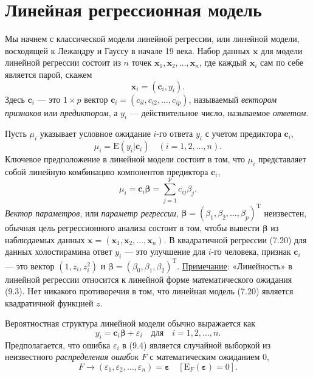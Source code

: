 \section{Линейная регрессионная модель}

Мы начнем с классической модели линейной регрессии, или линейной модели, восходящей к Лежандру и Гауссу в начале 19 века. Набор данных $\textbf{x}$ для модели линейной регрессии состоит из $n$ точек $\textbf{x}_1, \textbf{x}_2, \ldots, \textbf{x}_n$, где каждый $\textbf{x}_i$ сам по себе является парой, скажем
\begin{equation}
	\textbf{x}_i = (\textbf{c}_i, y_i).
\end{equation}
Здесь $\textbf{c}_i$ --- это $1 \times p$ вектор $\textbf{c}_i = (c_{il}, c_{i2}, \ldots, c_{ip})$, называемый \textit{вектором признаков} или \textit{предиктором}, а $y_i$ --- действительное число, называемое \textit{ответом}.

Пусть $\mu_i$ указывает условное ожидание $i$-го ответа $y_i$ с учетом предиктора $\textbf{c}_i$,
\begin{equation}
	\mu_i = \text{E}(y_i|\textbf{c}_i) \quad (i = 1,2, \ldots, n).
\end{equation}
Ключевое предположение в линейной модели состоит в том, что $\mu_i$ представляет собой линейную комбинацию компонентов предиктора $\textbf{c}_i$,
\begin{equation}
	\mu_i = \textbf{c}_i \bm{\beta} = \sum\limits_{j=1}^{p} c_{ij} \beta_j.
\end{equation}
\textit{Вектор параметров}, или \textit{параметр регрессии}, $\bm{\beta} = (\beta_1, \beta_2, \ldots, \beta_p)^\text{T}$ неизвестен, обычная цель регрессионного анализа состоит в том, чтобы вывести $\bm{\beta}$ из наблюдаемых данных $\textbf{x} = (\textbf{x}_1, \textbf{x}_2, \ldots, \textbf{x}_n)$. В квадратичной регрессии (7.20) для данных холостирамина ответ $y_i$ --- это улучшение для $i$-го человека, признак $\textbf{c}_i$ --- это вектор $(1, z_i, z_i^2)$ и $\bm{\beta} = (\beta_0, \beta_1, \beta_2)^\text{T}$. \underline{Примечание}: «Линейность» в линейной регрессии относится к линейной форме математического ожидания (9.3). Нет никакого противоречия в том, что линейная модель (7.20) является квадратичной функцией $z$.

Вероятностная структура линейной модели обычно выражается как
\begin{equation}
	y_i = \textbf{c}_i \bm{\beta} + \varepsilon_i \quad \text{для} \quad i = 1,2,\ldots,n.
\end{equation}
Предполагается, что ошибка $\varepsilon_i$ в (9.4) является случайной выборкой из неизвестного \textit{распределения ошибок} $F$ с математическим ожиданием $0$,
\begin{equation}
	F \to (\varepsilon_1, \varepsilon_2, \ldots, \varepsilon_n) = \bm{\varepsilon} \quad [\text{E}_F(\bm{\varepsilon})=0].
\end{equation}

